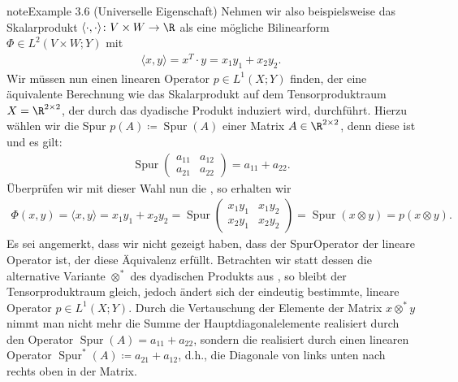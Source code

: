 \documentclass[letterpaper,10pt,german]{jupyterBook}
\begin{document}
\begin{sphinxadmonition}{note}{Example 3.6 (Universelle Eigenschaft)}
\sphinxAtStartPar
Nehmen wir also beispielsweise das Skalarprodukt \(\langle \cdot, \cdot \rangle \colon V \times W \rightarrow \R\) als eine mögliche Bilinearform \(\Phi \in L^2(V \times W; Y)\) mit
\begin{equation*}
\begin{split}\langle x, y \rangle = x^T \cdot y = x_1y_1 + x_2y_2.\end{split}
\end{equation*}
\sphinxAtStartPar
Wir müssen nun einen linearen Operator \(p \in L^1(X; Y)\) finden, der eine äquivalente Berechnung wie das Skalarprodukt auf dem Tensorproduktraum \(X = \R^{2 \times 2}\), der durch das dyadische Produkt induziert wird, durchführt.
Hierzu wählen wir die Spur \(p(A) \coloneqq \operatorname{Spur}(A)\) einer Matrix \(A \in \R^{2 \times 2}\), denn diese ist  und es gilt:
\begin{equation*}
\begin{split}\operatorname{Spur}
\begin{pmatrix}
a_{11} & a_{12} \\
a_{21} & a_{22}
\end{pmatrix}
= a_{11} + a_{22}.\end{split}
\end{equation*}
\sphinxAtStartPar
Überprüfen wir mit dieser Wahl nun die , so erhalten wir
\begin{equation*}
\begin{split}\Phi(x,y) = \langle x, y \rangle = x_1y_1 + x_2y_2 = \operatorname{Spur}
\begin{pmatrix}
x_1y_1 & x_1y_2 \\
x_2y_1 & x_2y_2
\end{pmatrix}
 = \operatorname{Spur}(x \otimes y) = p(x \otimes y).\end{split}
\end{equation*}
\sphinxAtStartPar
Es sei angemerkt, dass wir nicht gezeigt haben, dass der Spur\sphinxhyphen{}Operator der  lineare Operator ist, der diese Äquivalenz erfüllt.
Betrachten wir statt dessen die alternative Variante \(\otimes^*\) des dyadischen Produkts aus {\hyperref[\detokenize{vektoranalysis/tensor:ex:tensorproduktVarianten}]{}}, so bleibt der Tensorproduktraum gleich, jedoch ändert sich der eindeutig bestimmte, lineare Operator \(p \in L^1(X; Y)\).
Durch die Vertauschung der Elemente der Matrix \(x \otimes^* y\) nimmt man nicht mehr die Summe der Hauptdiagonalelemente realisiert durch den Operator \(\operatorname{Spur}(A) = a_{11} + a_{22}\), sondern die  realisiert durch einen linearen Operator \(\operatorname{Spur}^*(A) \coloneqq a_{21} + a_{12}\), d.h., die Diagonale von links unten nach rechts oben in der Matrix.

\end{sphinxadmonition}
\end{document}
